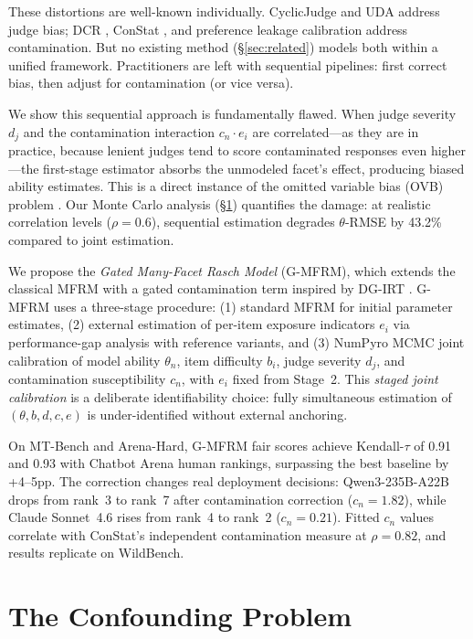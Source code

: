 \documentclass[11pt,twocolumn]{article}
\newcommand{\gmfrm}{\textsc{G-MFRM}}
\begin{document}
These distortions are well-known individually. CyclicJudge \citep{xu2024cyclic} and UDA \citep{park2024uda} address judge bias; DCR \citep{yang2025dcr}, ConStat \citep{dong2024constat}, and preference leakage calibration address contamination. But no existing method (\S\ref{sec:related}) models both within a unified framework. Practitioners are left with sequential pipelines: first correct bias, then adjust for contamination (or vice versa).

We show this sequential approach is fundamentally flawed. When judge severity $d_j$ and the contamination interaction $c_n \cdot e_i$ are correlated---as they are in practice, because lenient judges tend to score contaminated responses even higher---the first-stage estimator absorbs the unmodeled facet's effect, producing biased ability estimates. This is a direct instance of the omitted variable bias (OVB) problem \citep{angrist2009mostly}. Our Monte Carlo analysis (\S\ref{sec:confounding}) quantifies the damage: at realistic correlation levels ($\rho=0.6$), sequential estimation degrades $\theta$-RMSE by 43.2\% compared to joint estimation.

We propose the \emph{Gated Many-Facet Rasch Model} (\gmfrm{}), which extends the classical MFRM \citep{linacre1994many} with a gated contamination term inspired by DG-IRT \citep{doebler2024dgirt}. \gmfrm{} uses a three-stage procedure: (1) standard MFRM for initial parameter estimates, (2) external estimation of per-item exposure indicators $e_i$ via performance-gap analysis with reference variants, and (3) NumPyro MCMC joint calibration of model ability $\theta_n$, item difficulty $b_i$, judge severity $d_j$, and contamination susceptibility $c_n$, with $e_i$ fixed from Stage~2. This \emph{staged joint calibration} is a deliberate identifiability choice: fully simultaneous estimation of $(\theta, b, d, c, e)$ is under-identified without external anchoring.

On MT-Bench and Arena-Hard, \gmfrm{} fair scores achieve Kendall-$\tau$ of 0.91 and 0.93 with Chatbot Arena human rankings, surpassing the best baseline by +4--5pp. The correction changes real deployment decisions: Qwen3-235B-A22B drops from rank~3 to rank~7 after contamination correction ($c_n=1.82$), while Claude Sonnet~4.6 rises from rank~4 to rank~2 ($c_n=0.21$). Fitted $c_n$ values correlate with ConStat's independent contamination measure at $\rho=0.82$, and results replicate on WildBench.

\section{The Confounding Problem}
\label{sec:confounding}
\end{document}
